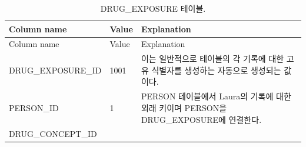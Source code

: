 \documentclass[11pt]{book}
\theoremstyle{definition}
\theoremstyle{definition}
\theoremstyle{definition}
\theoremstyle{remark}
\begin{document}
\begin{longtable}[]{@{}lll@{}}
\caption{\label{tab:drugExposure} DRUG\_EXPOSURE 테이블.}\tabularnewline
\toprule
\begin{minipage}[b]{0.28\columnwidth}\raggedright\strut
Column name\strut
\end{minipage} & \begin{minipage}[b]{0.16\columnwidth}\raggedright\strut
Value\strut
\end{minipage} & \begin{minipage}[b]{0.48\columnwidth}\raggedright\strut
Explanation\strut
\end{minipage}\tabularnewline
\midrule
\endfirsthead
\toprule
\begin{minipage}[b]{0.28\columnwidth}\raggedright\strut
Column name\strut
\end{minipage} & \begin{minipage}[b]{0.16\columnwidth}\raggedright\strut
Value\strut
\end{minipage} & \begin{minipage}[b]{0.48\columnwidth}\raggedright\strut
Explanation\strut
\end{minipage}\tabularnewline
\midrule
\endhead
\begin{minipage}[t]{0.28\columnwidth}\raggedright\strut
DRUG\_EXPOSURE\_ID\strut
\end{minipage} & \begin{minipage}[t]{0.16\columnwidth}\raggedright\strut
1001\strut
\end{minipage} & \begin{minipage}[t]{0.48\columnwidth}\raggedright\strut
이는 일반적으로 테이블의 각 기록에 대한 고유 식별자를 생성하는 자동으로
생성되는 값이다.\strut
\end{minipage}\tabularnewline
\begin{minipage}[t]{0.28\columnwidth}\raggedright\strut
PERSON\_ID\strut
\end{minipage} & \begin{minipage}[t]{0.16\columnwidth}\raggedright\strut
1\strut
\end{minipage} & \begin{minipage}[t]{0.48\columnwidth}\raggedright\strut
PERSON 테이블에서 Laura의 기록에 대한 외래 키이며 PERSON을
DRUG\_EXPOSURE에 연결한다.\strut
\end{minipage}\tabularnewline
\begin{minipage}[t]{0.28\columnwidth}\raggedright\strut
DRUG\_CONCEPT\_ID\strut
\end{minipage} & \begin{minipage}[t]{0.16\columnwidth}\raggedright\strut

\end{minipage}
\end{longtable}
\end{document}
